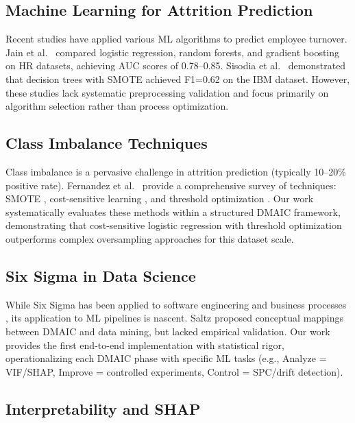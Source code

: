 \documentclass[conference]{IEEEtran}
\begin{document}
\subsection{Machine Learning for Attrition Prediction}

Recent studies have applied various ML algorithms to predict employee turnover. Jain et al.~\cite{jain2021employee} compared logistic regression, random forests, and gradient boosting on HR datasets, achieving AUC scores of 0.78--0.85. Sisodia et al.~\cite{sisodia2018prediction} demonstrated that decision trees with SMOTE achieved F1=0.62 on the IBM dataset. However, these studies lack systematic preprocessing validation and focus primarily on algorithm selection rather than process optimization.

\subsection{Class Imbalance Techniques}

Class imbalance is a pervasive challenge in attrition prediction (typically 10--20\% positive rate). Fernandez et al.~\cite{fernandez2018learning} provide a comprehensive survey of techniques: SMOTE \cite{chawla2002smote}, cost-sensitive learning \cite{elkan2001foundations}, and threshold optimization \cite{saito2015precision}. Our work systematically evaluates these methods within a structured DMAIC framework, demonstrating that cost-sensitive logistic regression with threshold optimization outperforms complex oversampling approaches for this dataset scale.

\subsection{Six Sigma in Data Science}

While Six Sigma has been applied to software engineering \cite{tayntor2003six} and business processes \cite{pande2000six}, its application to ML pipelines is nascent. Saltz \cite{saltz2015integrating} proposed conceptual mappings between DMAIC and data mining, but lacked empirical validation. Our work provides the first end-to-end implementation with statistical rigor, operationalizing each DMAIC phase with specific ML tasks (e.g., Analyze = VIF/SHAP, Improve = controlled experiments, Control = SPC/drift detection).

\subsection{Interpretability and SHAP}
\end{document}
